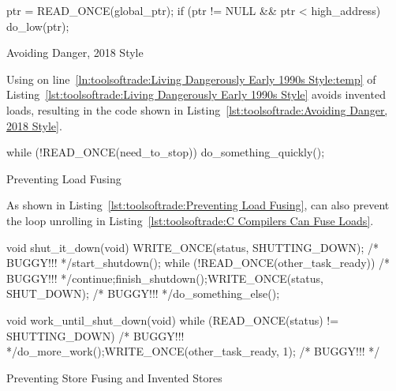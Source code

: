 \begin{listing}[tbp]
\begin{fcvlabel}
\begin{VerbatimL}[commandchars=\\\{\}]
ptr = READ_ONCE(global_ptr);
if (ptr != NULL && ptr < high_address)
	do_low(ptr);
\end{VerbatimL}
\end{fcvlabel}
\caption{Avoiding Danger, 2018 Style}
\label{lst:toolsoftrade:Avoiding Danger, 2018 Style}
\end{listing}

Using  on
line~\ref{ln:toolsoftrade:Living Dangerously Early 1990s Style:temp} of
Listing~\ref{lst:toolsoftrade:Living Dangerously Early 1990s Style}
avoids invented loads,
resulting in the code shown in
Listing~\ref{lst:toolsoftrade:Avoiding Danger, 2018 Style}.

\begin{listing}[tbp]
\begin{fcvlabel}
\begin{VerbatimL}[commandchars=\\\{\}]
while (!READ_ONCE(need_to_stop))
	do_something_quickly();
\end{VerbatimL}
\end{fcvlabel}
\caption{Preventing Load Fusing}
\label{lst:toolsoftrade:Preventing Load Fusing}
\end{listing}

As shown in
Listing~\ref{lst:toolsoftrade:Preventing Load Fusing},
 can also prevent the loop unrolling in
Listing~\ref{lst:toolsoftrade:C Compilers Can Fuse Loads}.

\begin{listing}[tbp]
\begin{fcvlabel}
\begin{VerbatimL}[commandchars=\\\[\]]
void shut_it_down(void)
{
	WRITE_ONCE(status, SHUTTING_DOWN); /* BUGGY!!! */\lnlbl[store:a]
	start_shutdown();
	while (!READ_ONCE(other_task_ready)) /* BUGGY!!! */\lnlbl[loop:b]
		continue;\lnlbl[loop:e]
	finish_shutdown();\lnlbl[finish]
	WRITE_ONCE(status, SHUT_DOWN); /* BUGGY!!! */\lnlbl[store:b]
	do_something_else();
}

void work_until_shut_down(void)
{
	while (READ_ONCE(status) != SHUTTING_DOWN) /* BUGGY!!! */
		do_more_work();
	WRITE_ONCE(other_task_ready, 1); /* BUGGY!!! */
}
\end{VerbatimL}
\end{fcvlabel}
\caption{Preventing Store Fusing and Invented Stores}
\label{lst:toolsoftrade:Preventing Store Fusing and Invented Stores}
\end{listing}

